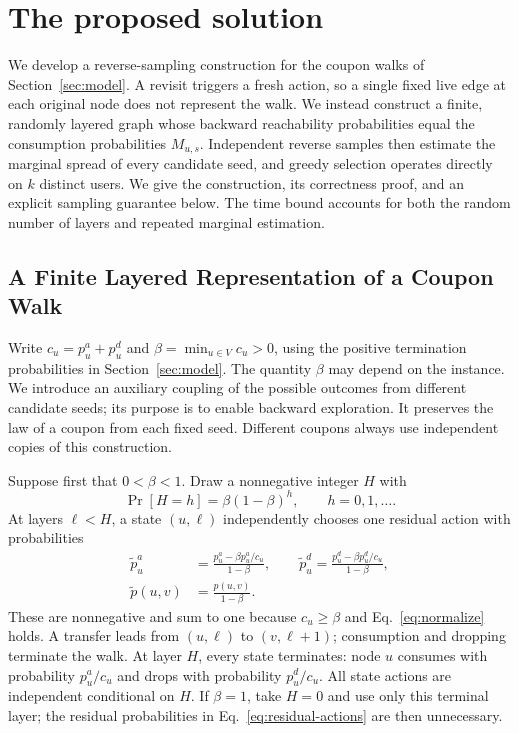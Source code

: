 \section{The proposed solution}
\label{sec:algo}

We develop a reverse-sampling construction for the coupon walks of
Section~\ref{sec:model}. A revisit triggers a fresh action, so a single
fixed live edge at each original node does not represent the walk.
We instead construct a finite, randomly layered graph whose backward
reachability probabilities equal the consumption probabilities
$M_{u,s}$. Independent reverse samples then estimate the marginal
spread of every candidate seed, and greedy selection operates directly
on $k$ distinct users. We give the construction, its correctness proof,
and an explicit sampling guarantee below. The time bound accounts for
both the random number of layers and repeated marginal estimation.

\subsection{A Finite Layered Representation of a Coupon Walk}
\label{sec:layered-world}

Write $c_u=p_u^a+p_u^d$ and
$\beta=\min_{u\in V}c_u>0$, using the positive termination probabilities
in Section~\ref{sec:model}. The quantity $\beta$ may depend on the
instance. We introduce an auxiliary coupling of the possible outcomes
from different candidate seeds; its purpose is to enable backward
exploration. It preserves the law of a coupon from each fixed seed.
Different coupons always use independent copies of this construction.

Suppose first that $0<\beta<1$. Draw a nonnegative integer $H$ with
\begin{equation}
\label{eq:random-horizon}
  \Pr[H=h]=\beta(1-\beta)^h,\qquad h=0,1,\ldots.
\end{equation}
At layers $\ell<H$, a state $(u,\ell)$ independently chooses one
residual action with probabilities
\begin{equation}
\label{eq:residual-actions}
\begin{split}
  \widetilde p_u^a&=\frac{p_u^a-\beta p_u^a/c_u}{1-\beta},\qquad
  \widetilde p_u^d=\frac{p_u^d-\beta p_u^d/c_u}{1-\beta},\\
  \widetilde p(u,v)&=\frac{p(u,v)}{1-\beta}.
\end{split}
\end{equation}
These are nonnegative and sum to one because $c_u\geq\beta$ and
Eq.~\eqref{eq:normalize} holds. A transfer leads from $(u,\ell)$
to $(v,\ell+1)$; consumption and dropping terminate the walk.
At layer $H$, every state terminates: node $u$ consumes with probability
$p_u^a/c_u$ and drops with probability $p_u^d/c_u$.
All state actions are independent conditional on $H$.
If $\beta=1$, take $H=0$ and use only this terminal layer; the residual
probabilities in Eq.~\eqref{eq:residual-actions} are then unnecessary.

